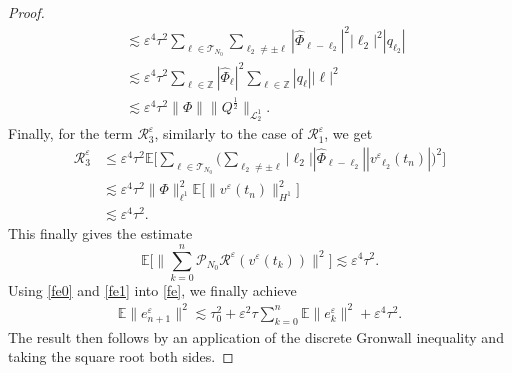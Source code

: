 \documentclass[a4paper]{amsart}
\begin{document}
\begin{proof}
\begin{align*}
&\lesssim \varepsilon^4 \tau^2 \sum_{\ell\in \mathcal{T}_{N_0}}\displaystyle\sum_{\ell_2 \ne \pm\ell} |\hat{\Phi}_{\ell-\ell_2}|^2 |\ell_2|^2|q_{\ell_2}|\\
&\lesssim \varepsilon^4 \tau^2 \sum_{\ell \in\mathbb{Z}}|\hat{\Phi}_{\ell}|^2 \sum_{\ell\in\mathbb{Z}}|q_{\ell}||\ell|^2\\
&\lesssim \varepsilon^4 \tau^2 \|\Phi\| \|Q^{\frac{1}{2}}\|_{\mathcal{L}_2^1}.
\end{align*}
Finally, for the term $\mathcal{R}^\varepsilon_3$, similarly to the case of $\mathcal{R}^\varepsilon_1$, we get
\begin{align*}
\mathcal{R}^\varepsilon_3 &\le \varepsilon^4 \tau^2 \mathbb{E}\big[\sum_{\ell\in\mathcal{T}_{N_0}}\big(\sum_{\ell_2\ne \pm \ell} |\ell_2||\hat{\Phi}_{\ell-\ell_2}| |\widehat{v^\varepsilon}_{\ell_2}(t_n)|\big)^2\big] \\
&\lesssim \varepsilon^4 \tau^2 \|\Phi\|^2_{\ell^1} \mathbb{E}\big[\|v^\varepsilon(t_n)\|^2_{H^1}\big]\\
&\lesssim \varepsilon^4 \tau^2.
\end{align*}
This finally gives the estimate
\begin{equation}
    \label{fe1}
\mathbb{E}\big[\|\sum_{k=0}^{n}\mathcal{P}_{N_0}\mathcal{R}^\varepsilon(v^\varepsilon(t_k))\|^2\big]\lesssim\varepsilon^4 \tau^2.
\end{equation}
Using \eqref{fe0} and \eqref{fe1} into \eqref{fe}, we finally achieve
$$
\begin{aligned}
    \mathbb{E}\|e^\varepsilon_{n+1}\|^{2} \lesssim \tau_0^2+\varepsilon^2 \tau \sum_{k=0}^{n}\mathbb{E}\|e^\varepsilon_k\|^2 +\varepsilon^4 \tau^2.
\end{aligned}
$$
The result then follows by an application of the discrete Gronwall inequality and taking the square root both sides.

\end{proof}
\end{document}
